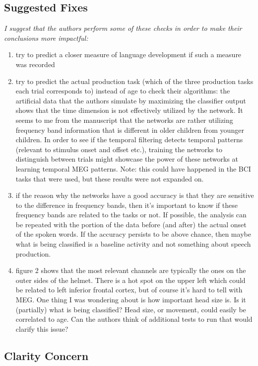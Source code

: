 \documentclass{article}
\begin{document}
\subsection*{Suggested Fixes}
{\em I suggest that the authors perform some of these checks in order to make their conclusions more impactful:}
  \begin{enumerate}
  \item{try to predict a closer measure of language development if such a measure was recorded}
  \item{try to predict the actual production task (which of the three production tasks each trial corresponds to) instead of age to check their algorithms: the artificial data that the authors simulate by maximizing the classifier output shows that the time dimension is not effectively utilized by the network. It seems to me from the manuscript that the networks are rather utilizing frequency band information that is different in older children from younger children. In order to see if the temporal filtering detects temporal patterns (relevant to stimulus onset and offset etc.), training the networks to distinguish between trials might showcase the power of these networks at learning temporal MEG patterns. Note: this could have happened in the BCI tasks that were used, but these results were not expanded on.}
  \item{if the reason why the networks have a good accuracy is that they are sensitive to the difference in frequency bands, then it's important to know if these frequency bands are related to the tasks or not. If possible, the analysis can be repeated with the portion of the data before (and after) the actual onset of the spoken words. If the accuracy persists to be above chance, then maybe what is being classified is a baseline activity and not something about speech production.}
    \item{figure 2 shows that the most relevant channels are typically the ones on the outer sides of the helmet. There is a hot spot on the upper left which could be related to left inferior frontal cortex, but of course it's hard to tell with MEG. One thing I was wondering about is how important head size is. Is it (partially) what is being classified? Head size, or movement, could easily be correlated to age. Can the authors think of additional tests to run that would clarify this issue?}
  \end{enumerate}

\subsection*{Clarity Concern}
\end{document}
